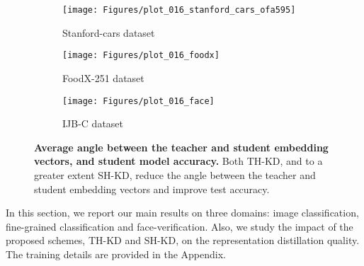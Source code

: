 


















































%
 

\begin{figure*}[t!]
\centering
\begin{subfigure}[a]{.33\textwidth}
  \centering
  \texttt{[image: Figures/plot\_016\_stanford\_cars\_ofa595]}
  \caption{Stanford-cars dataset}
\end{subfigure}\begin{subfigure}[h]{.33\textwidth }
  \centering
  \texttt{[image: Figures/plot\_016\_foodx]}
  \caption{FoodX-251 dataset}
\end{subfigure}
\begin{subfigure}[h]{.33\textwidth }
  \centering
  \texttt{[image: Figures/plot\_016\_face]}
  \caption{IJB-C dataset}
\end{subfigure}
\caption{\textbf{Average angle between the teacher and student embedding vectors, and student model accuracy.} Both TH-KD, and to a greater extent SH-KD, reduce the angle between the teacher and student embedding vectors and improve test accuracy.}

\label{fig:angle}
\vspace{-3mm}
\end{figure*}



In this section, we report our main results on three domains: image classification, fine-grained classification and face-verification. 
Also, we study the impact of the proposed schemes, TH-KD and SH-KD, on the representation distillation quality.
The training details are provided in the Appendix.
